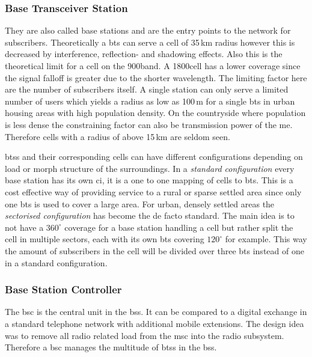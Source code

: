 \subsubsection{Base Transceiver Station}
They are also called base stations and are the entry points to the network for subscribers.
Theoretically a \gls{bts} can serve a cell of 35\,km radius however this is decreased by interference, reflection- and shadowing effects.
Also this is the theoretical limit for a cell on the 900\MHz band.
A 1800\MHz cell has a lower coverage since the signal falloff is greater due to the shorter wavelength.
The limiting factor here are the number of subscribers itself.
A single station can only serve a limited number of users which yields a radius as low as 100\,m for a single \gls{bts} in urban housing areas \cite{kommsys2006} with high population density.
On the countryside where population is less dense the constraining factor can also be transmission power of the \gls{me}.
Therefore cells with a radius of above 15\,km are seldom seen.

\glspl{bts} and their corresponding cells can have different configurations depending on load or morph structure of the surroundings.
In a \emph{standard configuration} every base station has its own \gls{ci}, it is a one to one mapping of cells to \gls{bts}.
This is a cost effective way of providing service to a rural or sparse settled area since only one \gls{bts} is used to cover a large area.
For urban, densely settled areas the  \emph{sectorised configuration} has become the de facto standard.
The main idea is to not have a $360^\circ$ coverage for a base station handling a cell but rather split the cell in multiple sectors, each with its own \gls{bts} covering $120^\circ$ for example. 
This way the amount of subscribers in the cell will be divided over three \gls{bts} instead of one in a standard configuration.

\subsubsection{Base Station Controller}
The \gls{bsc} is the central unit in the \gls{bss}.
It can be compared to a digital exchange in a standard telephone network with additional mobile extensions.
The design idea was to remove all radio related load from the \gls{msc} into the radio subsystem.
Therefore a \gls{bsc} manages the multitude of \glspl{bts} in the \gls{bss}.

